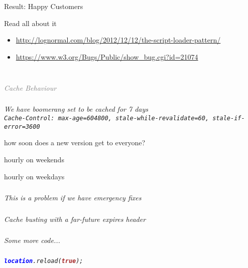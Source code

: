 \documentclass{beamer}
\newcommand{\innersplash}[1]{
  \begin{center}
    \Large \textrm{\textit{ #1 } }
  \end{center}
}
\newcommand{\splashslide}[2][{}]{
  \begin{frame}
  \frametitle{#1}
  \innersplash{#2}
  \end{frame}
}
\newcommand{\leadinslide}[2]{
  \splashslide{
     {\fontsize{150}{20}\selectfont{\raisebox{0pt}[90pt][0pt]{\textcolor{light-gray}{#1}}}} \\ \huge \textcolor{gray}{#2}
  }
}
\def\brown<#1>#2{\textcolor<#1>{brown}{\textbf<#1>{#2}}}
\def\blue<#1>#2{\textcolor<#1>{blue}{\textbf<#1>{#2}}}
\begin{document}
\begin{frame}{Result: Happy Customers}
\end{frame}

\begin{frame}{Read all about it}
\begin{itemize}
  \item \href{http://www.lognormal.com/blog/2012/12/12/the-script-loader-pattern/}{http://lognormal.com/blog/2012/12/12/the-script-loader-pattern/}
  \item \href{https://www.w3.org/Bugs/Public/show_bug.cgi?id=21074}{https://www.w3.org/Bugs/Public/show\_bug.cgi?id=21074}
\end{itemize}
\end{frame}

\leadinslide{2}{Cache Behaviour}

\splashslide{We have boomerang set to be cached for 7 days \\ \small \texttt{Cache-Control: max-age=604800, stale-while-revalidate=60, stale-if-error=3600}}

\begin{frame}{how soon does a new version get to everyone?}
\end{frame}

\begin{frame}{hourly on weekends}
\end{frame}

\begin{frame}{hourly on weekdays}
\end{frame}


\splashslide{This is a problem if we have emergency fixes}

\splashslide{Cache busting with a far-future expires header}

\splashslide{Some more code...}

\splashslide{\texttt{\blue<1>{location}.reload(\brown<1>{true});}}
\end{document}
